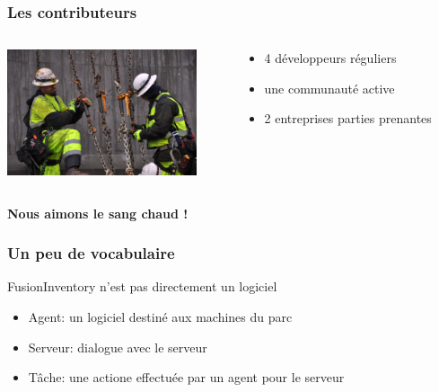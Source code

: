 \documentclass{beamer}
\begin{document}
\begin{frame}
    \frametitle{Les contributeurs}

 \begin{columns}
 \begin{column}[T]{4cm}
    \includegraphics[height=3.7cm]{./pics/worker.jpg}
 \end{column}
 \begin{column}[t]{5cm}
    \begin{itemize}
    \item 4 développeurs réguliers
    \item une communauté active
    \item 2 entreprises parties prenantes
    \end{itemize}

 \end{column}
\end{columns}

    \pause
    \bf{Nous aimons le sang chaud !}
\end{frame}



\begin{frame}
    \frametitle{Un peu de vocabulaire}

    \begin{block}{FusionInventory n'est pas directement un logiciel}
    \begin{itemize}
        \item Agent: un logiciel destiné aux machines du parc
        \item Serveur: dialogue avec le serveur
        \item Tâche: une actione effectuée par un agent pour le serveur
    \end{itemize}
    \end{block}

\end{frame}
\end{document}

